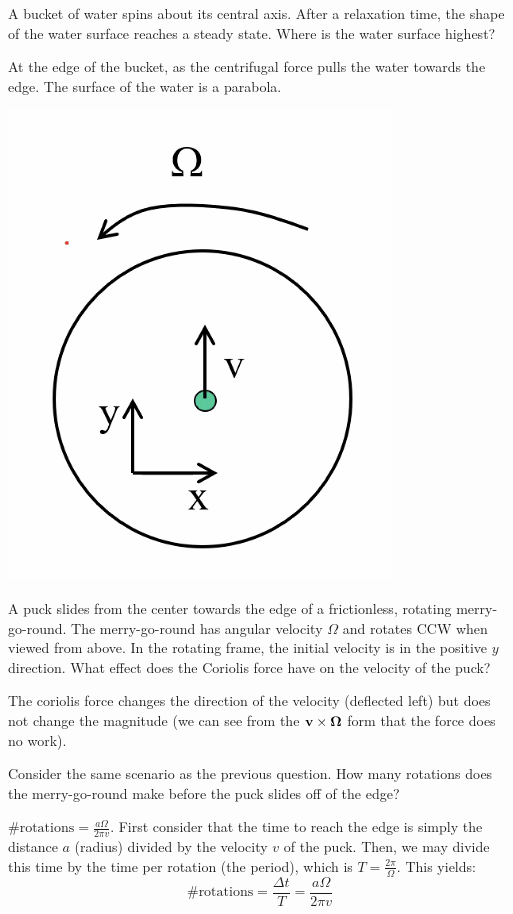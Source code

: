 A bucket of water spins about its central axis. After a relaxation time, the shape of the water surface reaches a steady state. Where is the water surface highest?
\begin{s}
At the edge of the bucket, as the centrifugal force pulls the water towards the edge. The surface of the water is a parabola.
\end{s}
\begin{center}
    \includegraphics[scale=0.5]{Lecture-16/l16-img1.png}
\end{center}
A puck slides from the center towards the edge of a frictionless, rotating merry-go-round. The merry-go-round has angular velocity $\Omega$ and rotates CCW when viewed from above. In the rotating frame, the initial velocity is in the positive $y$ direction. What effect does the Coriolis force have on the velocity of the puck?
\begin{s}
The coriolis force changes the direction of the velocity (deflected left) but does not change the magnitude (we can see from the $\mathbf{v} \times \mathbf{\Omega}$ form that the force does no work).
\end{s}

Consider the same scenario as the previous question. How many rotations does the merry-go-round make before the puck slides off of the edge?

\begin{s}
$\# \text{rotations} = \frac{a\Omega}{2\pi v}$. First consider that the time to reach the edge is simply the distance $a$ (radius) divided by the velocity $v$ of the puck. Then, we may divide this time by the time per rotation (the period), which is $T = \frac{2\pi}{\Omega}$. This yields:
\[\# \text{rotations} = \frac{\Delta t}{T} = \frac{a\Omega}{2\pi v}\]
\end{s}

